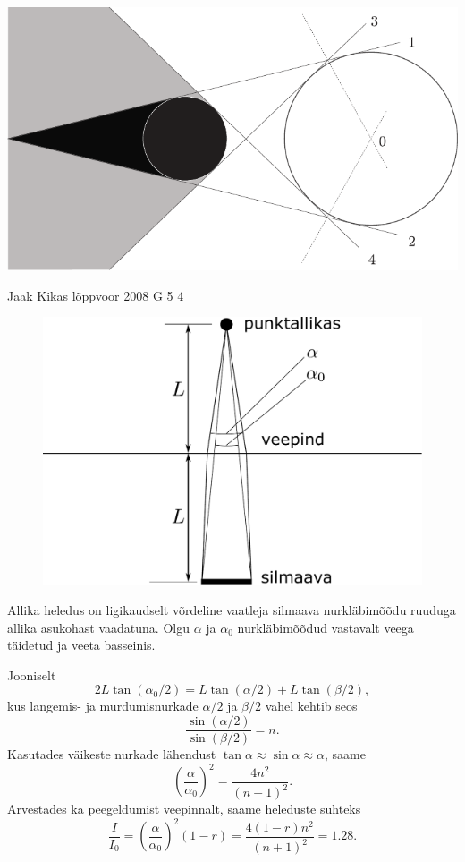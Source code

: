 \documentclass[11pt]{article}
\begin{document}
{{\begin{center}
	\includegraphics[width=\textwidth]{2007-v2g-06-lah}
\end{center}
\fi
}

{Jaak Kikas} %
{lõppvoor} %
{2008} %
{G 5} %
{4} %
{

\ifSolution
\begin{figure}
	\begin{center}
		\includegraphics[width=0.95\linewidth]{2008-v3g-05-lah}
	\end{center}
\end{figure}
Allika heledus on ligikaudselt võrdeline vaatleja silmaava nurkläbimõõdu ruuduga allika asukohast vaadatuna. Olgu $\alpha$ ja $\alpha_0$ nurkläbimõõdud vastavalt veega täidetud ja veeta basseinis.

Jooniselt
\[
2L\tan (\alpha_0 /2) = L\tan (\alpha /2) + L\tan (\beta /2),
\]
kus langemis- ja murdumisnurkade $\alpha /2$ ja $\beta /2$ vahel kehtib seos
\[
\frac{\sin(\alpha/2)}{\sin(\beta/2)} = n.
\]
Kasutades väikeste nurkade lähendust $\tan\alpha\approx\sin\alpha\approx\alpha$, saame 
\[
\left(\frac{\alpha}{\alpha_0}\right)^2 = \frac{4n^2}{(n+1)^2}.
\]
Arvestades ka peegeldumist veepinnalt, saame heleduste suhteks
\[
\frac{I}{I_{0}}=\left(\frac{\alpha}{\alpha_0}\right)^2(1-r) = \frac{4(1-r) n^{2}}{(n+1)^{2}}=\num{1,28}.
\]
\fi
}

}
\end{document}
